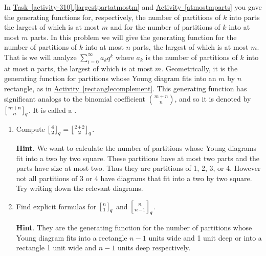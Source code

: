 \documentclass{book}
\begin{document}
\setcounter{cpjt}{327}
\addtocounter{cpjt}{-1}
\begin{activity}\label{qtorialformula}
\hypertarget{p-1613}{}%
In \hyperref[largestpartatmostm]{Task~\ref{activity-310}.\ref{largestpartatmostm}} and \hyperref[atmostmparts]{Activity~\ref{atmostmparts}} you gave the generating functions for, respectively, the number of partitions of \(k\) into parts the largest of which is at most \(m\) and for the number of partitions of \(k\) into at most \(m\) parts. In this problem we will give the generating function for the number of partitions of \(k\) into at most \(n\) parts, the largest of which is at most \(m\). That is we will analyze \(\sum_{i=0}^\infty a_kq^k\) where \(a_k\) is the number of partitions of \(k\) into at most \(n\) parts, the largest of which is at most \(m\). Geometrically, it is the generating function for partitions whose Young diagram fits into an \(m\) by \(n\) rectangle, as in \hyperref[rectanglecomplement]{Activity~\ref{rectanglecomplement}}. This generating function has significant analogs to the binomial coefficient \(\binom{m+n}{n}\), and so it is denoted by \(\left[{m+n\atop n}\right]_q\). It is called a .%
\begin{enumerate}[font=\bfseries,label=(\alph*),ref=\alph*]
\item\label{task-279} \hypertarget{p-1614}{}%
Compute \(\left[{4\atop2}\right]_q=\left[{2+2\atop2}\right]_q\).%
\par\smallskip%
\noindent\textbf{Hint}.\hypertarget{hint-217}{}\quad%
\hypertarget{p-1615}{}%
We want to calculate the number of partitions whose Young diagrams fit into a two by two square. These partitions have at most two parts and the parts have size at most two. Thus they are partitions of 1, 2, 3, or 4. However not all partitions of 3 or 4 have diagrams that fit into a two by two square. Try writing down the relevant diagrams.%
\par\smallskip%
\noindent\item\label{task-280} \hypertarget{p-1617}{}%
Find explicit formulas for \(\left[{n\atop1}\right]_q\) and \(\left[{n\atop n-1}\right]_q\).%
\par\smallskip%
\noindent\textbf{Hint}.\hypertarget{hint-218}{}\quad%
\hypertarget{p-1618}{}%
They are the generating function for the number of partitions whose Young diagram fits into a rectangle \(n - 1\) units wide and 1 unit deep or into a rectangle 1 unit wide and \(n - 1\) units deep respectively.%
\par\smallskip%

\end{enumerate}
\end{activity}
\end{document}

